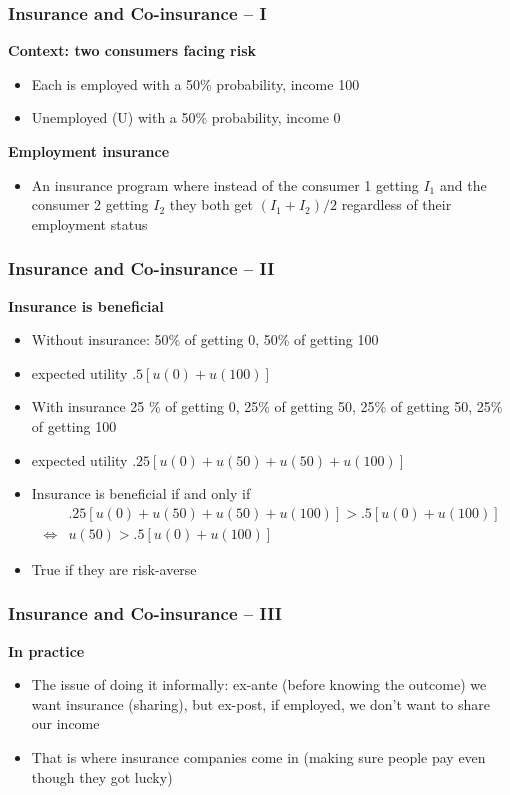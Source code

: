 \documentclass[handout]{beamer}
\newenvironment{iPar}[1]{\textbf{#1} \begin{itemize}}{\end{itemize}}
\newcommand{\mdp}{\medskip \pause}
\begin{document}
\begin{frame}\frametitle{Insurance and Co-insurance -- I}
\begin{iPar}{Context: two consumers facing risk}  \item Each is employed with a 50\% probability, income 100 \item Unemployed (U) with a 50\% probability, income 0\end{iPar}\mdp

\begin{iPar}{Employment insurance} \item An insurance program where instead of the consumer 1 getting $I_1$ and the consumer 2 getting $I_2$ they both get $(I_1+I_2)/2$ regardless of their employment status \end{iPar}

\end{frame}

\begin{frame} \frametitle{Insurance and Co-insurance -- II}

\begin{iPar}{Insurance is beneficial} \item Without insurance: 50\%
of getting 0, 50\% of getting 100 \item expected utility $ .5 [u(0) + u(100)] $ \item
With insurance 25 \% of getting 0, 25\% of getting 50, 25\% of getting 50, 25\% of getting
100 \item expected utility $.25[u(0) + u(50) + u(50) + u(100)]$ \item
Insurance is beneficial if and only if \begin{eqnarray*} & .25[u(0) + u(50) +
u(50) + u(100)] > .5 [u(0) + u(100)]\\ \iff& u(50) > .5[u(0)+u(100)]
\end{eqnarray*}\item True if they are risk-averse  \end{iPar}

\end{frame}

\begin{frame} \frametitle{Insurance and Co-insurance -- III}
\begin{iPar}{In practice} \item The issue of doing it informally:
ex-ante (before knowing the outcome) we want insurance (sharing), but ex-post, if employed, we don't want to share our income \item That is where insurance companies come in
(making sure people pay even though they got lucky)\end{iPar}

\end{frame}
\end{document}
